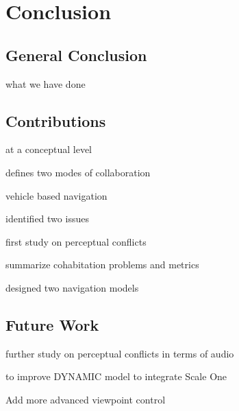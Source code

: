 \chapter*{Conclusion}
\mtcaddchapter[Conclusion]

\section*{General Conclusion}

what we have done

\section*{Contributions}

at a conceptual level

defines two modes of collaboration

vehicle based navigation

identified two issues

first study on perceptual conflicts

summarize cohabitation problems and metrics

designed two navigation models

\section*{Future Work}

further study on perceptual conflicts in terms of audio

to improve DYNAMIC model to integrate Scale One

Add more advanced viewpoint control
